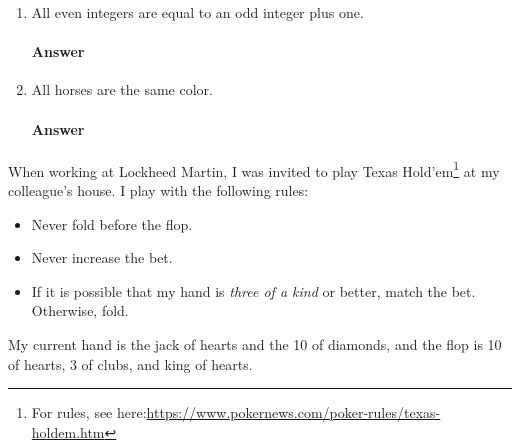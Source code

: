 \documentclass{article}
\begin{document}
\begin{enumerate}

    \item All even integers are equal to an odd integer plus one.

        \paragraph{Answer}

    \item All horses are the same color.

        \paragraph{Answer}

\end{enumerate}


\collab{\todo{}}

When working at Lockheed Martin, I was invited to play Texas
Hold'em\footnote{For rules, see
here:\url{https://www.pokernews.com/poker-rules/texas-holdem.htm}} at my
colleague's house.  I play with the following rules:
\begin{itemize}
    \item Never fold before the flop.
    \item Never increase the bet.
    \item If it is possible that my hand is \emph{three of a kind} or better,
        match the bet.  Otherwise, fold.
\end{itemize}
My current hand is the jack of hearts and the 10 of diamonds, and the flop is 10
of hearts, 3 of clubs, and king of hearts.
\end{document}
